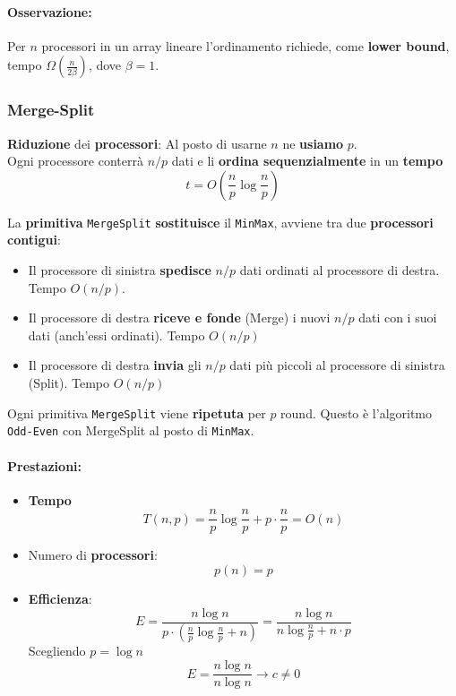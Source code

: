 \paragraph{Osservazione:} Per $n$ processori in un array lineare l'ordinamento richiede, come \textbf{lower bound}, tempo $\Omega \left(\frac{n}{2 \beta}\right)$, dove $\beta = 1$.\\

\newpage

\subsubsection{Merge-Split}

\textbf{Riduzione} dei \textbf{processori}: Al posto di usarne $n$ ne \textbf{usiamo} $p$.\\

Ogni processore conterrà $n/p$ dati e li \textbf{ordina sequenzialmente} in un \textbf{tempo} 
$$ t = O\left(\frac{n}{p} \log \frac{n}{p} \right)$$

La \textbf{primitiva} \texttt{MergeSplit} \textbf{sostituisce} il \texttt{MinMax}, avviene tra due \textbf{processori contigui}: 
\begin{itemize}
	\item Il processore di sinistra \textbf{spedisce} $n/p$ dati ordinati al processore di destra. Tempo $O(n/p)$.
	\item Il processore di destra \textbf{riceve e fonde} (Merge) i nuovi $n/p$ dati con i suoi dati (anch'essi ordinati). Tempo $O(n/p)$
	\item Il processore di destra \textbf{invia} gli $n/p$ dati più piccoli al processore di sinistra (Split). Tempo $O(n/p)$
\end{itemize}

Ogni primitiva \texttt{MergeSplit} viene \textbf{ripetuta} per $p$ round. Questo è l'algoritmo \texttt{Odd-Even} con MergeSplit al posto di \texttt{MinMax}.\\

\paragraph{Prestazioni: }
\begin{itemize}
	\item \textbf{Tempo }
	$$ T(n,p) = \frac{n}{p} \log \frac{n}{p} + p \cdot \frac{n}{p} = O(n) $$
	\item Numero di \textbf{processori}: 
	$$ p(n) = p $$
	\item \textbf{Efficienza}:
	$$ E = \frac{n \log n}{p \cdot \left(\frac{n}{p} \log \frac{n}{p} + n\right)} = \frac{n \log n}{ n \log \frac{n}{p} + n \cdot p} $$
	Scegliendo $p = \log n$
	$$ E = \frac{n \log n}{n \log n} \rightarrow c \neq 0 $$
\end{itemize}

